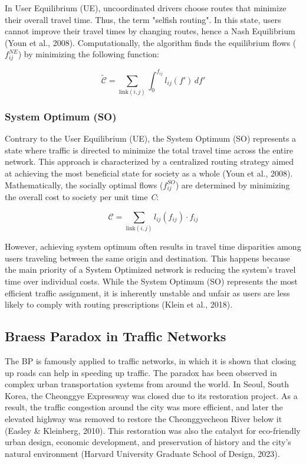 In User Equilibrium (UE), uncoordinated drivers choose routes that minimize their overall travel time. Thus, the term "selfish routing". In this state, users cannot improve their travel times by changing routes, hence a Nash Equilibrium (Youn et al., 2008). Computationally, the algorithm finds the equilibrium flows ($f_{ij}^{NE}$) by minimizing the following function:

\begin{equation}
    \tilde{\mathcal{C}} = \sum_{\text{link}(i,j)} \int_{0}^{f_{ij}} l_{ij}(f') \, df'
    \label{eq:beckmann_objective}
\end{equation}

\subsubsection{System Optimum (SO)}
\label{chap:SO}

Contrary to the User Equilibrium (UE), the System Optimum (SO) represents a state where traffic is directed to minimize the total travel time across the entire network. This approach is characterized by a centralized routing strategy aimed at achieving the most beneficial state for society as a whole (Youn et al., 2008). Mathematically, the socially optimal flows ($f_{ij}^{SO}$) are determined by minimizing the overall cost to society per unit time \textit{C}:

\begin{equation}
    \mathcal{C} = \sum_{\text{link}(i,j)} l_{ij}(f_{ij}) \cdot f_{ij}
    \label{eq:system_optimum}
\end{equation}

However, achieving system optimum often results in travel time disparities among users traveling between the same origin and destination. This happens because the main priority of a System Optimized network is reducing the system's travel time over individual costs. While the System Optimum (SO) represents the most efficient traffic assignment, it is inherently unstable and unfair as users are less likely to comply with routing prescriptions (Klein et al., 2018).

\subsection{Braess Paradox in Traffic Networks}
\label{chap:bp_traffic_networks}

The BP is famously applied to traffic networks, in which it is shown that closing up roads can help in speeding up traffic. The paradox has been observed in complex urban transportation systems from around the world. In Seoul, South Korea, the Cheonggye Expressway was closed due to its restoration project. As a result, the traffic congestion around the city was more efficient, and later the elevated highway was removed to restore the Cheonggyecheon River below it (Easley \& Kleinberg, 2010). This restoration was also the catalyst for eco-friendly urban design, economic development, and preservation of history and the city's natural environment (Harvard University Graduate School of Design, 2023).

